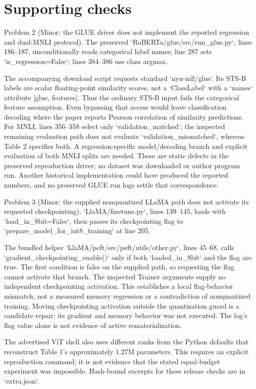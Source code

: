 \documentclass[10pt]{article}
\begin{document}
\section*{Supporting checks}
Problem 2 (Minor: the GLUE driver does not implement the reported regression and dual-MNLI protocol).  The preserved `RoBERTa/glue/src/run\_glue.py`, lines 186–187, unconditionally reads categorical label names; line 287 sets `is\_regression=False`; lines 384–386 use class argmax.\par
The accompanying download script requests standard `nyu-mll/glue`. Its STS-B labels are scalar floating-point similarity scores, not a `ClassLabel` with a `names` attribute [glue, features]. Thus the ordinary STS-B input fails the categorical feature assumption. Even bypassing that access would leave classification decoding where the paper reports Pearson correlation of similarity predictions. For MNLI, lines 356–358 select only `validation\_matched`; the inspected remaining evaluation path does not evaluate `validation\_mismatched`, whereas Table 2 specifies both. A regression-specific model/decoding branch and explicit evaluation of both MNLI splits are needed. These are static defects in the preserved reproduction driver; no dataset was downloaded or author program run. Another historical implementation could have produced the reported numbers, and no preserved GLUE run logs settle that correspondence.\par
Problem 3 (Minor: the supplied nonquantized LLaMA path does not activate its requested checkpointing).  `LlaMA/finetune.py`, lines 139–145, loads with `load\_in\_8bit=False`, then passes its checkpointing flag to `prepare\_model\_for\_int8\_training` at line 205.\par
The bundled helper `LlaMA/peft/src/peft/utils/other.py`, lines 45–68, calls `gradient\_checkpointing\_enable()` only if both `loaded\_in\_8bit` and the flag are true. The first condition is false on the supplied path, so requesting the flag cannot activate that branch. The inspected Trainer arguments supply no independent checkpointing activation. This establishes a local flag-behavior mismatch, not a measured memory regression or a contradiction of nonquantized training. Moving checkpointing activation outside the quantization guard is a candidate repair; its gradient and memory behavior was not executed. The log’s flag value alone is not evidence of active rematerialization.\par
The advertised ViT shell also uses different ranks from the Python defaults that reconstruct Table 1’s approximately 1.27M parameters. This requires an explicit reproduction command; it is not evidence that the stated equal-budget experiment was impossible. Hash-bound excerpts for these release checks are in `extra.json`.\par
\end{document}
